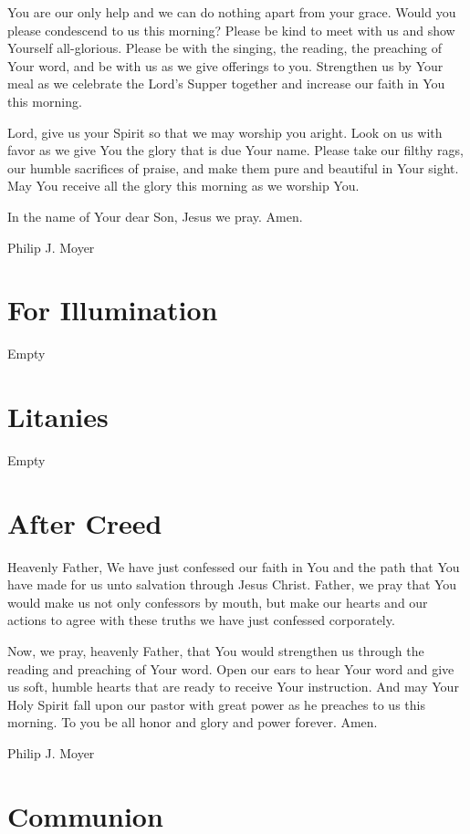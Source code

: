 \documentclass[]{book}
\begin{document}
You are our only help and we can do nothing apart from your grace. Would
you please condescend to us this morning? Please be kind to meet with us
and show Yourself all-glorious. Please be with the singing, the reading,
the preaching of Your word, and be with us as we give offerings to you.
Strengthen us by Your meal as we celebrate the Lord's Supper together
and increase our faith in You this morning.

Lord, give us your Spirit so that we may worship you aright. Look on us
with favor as we give You the glory that is due Your name. Please take
our filthy rags, our humble sacrifices of praise, and make them pure and
beautiful in Your sight. May You receive all the glory this morning as
we worship You.

In the name of Your dear Son, Jesus we pray. Amen.

Philip J. Moyer

\section{For Illumination}\label{for-illumination}

Empty

\section{Litanies}\label{litanies}

Empty

\section{After Creed}\label{after-creed}

Heavenly Father, We have just confessed our faith in You and the path
that You have made for us unto salvation through Jesus Christ. Father,
we pray that You would make us not only confessors by mouth, but make
our hearts and our actions to agree with these truths we have just
confessed corporately.

Now, we pray, heavenly Father, that You would strengthen us through the
reading and preaching of Your word. Open our ears to hear Your word and
give us soft, humble hearts that are ready to receive Your instruction.
And may Your Holy Spirit fall upon our pastor with great power as he
preaches to us this morning. To you be all honor and glory and power
forever. Amen.

Philip J. Moyer

\section{Communion}\label{communion}
\end{document}
